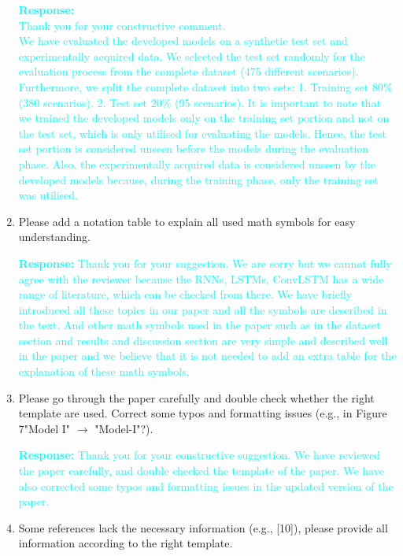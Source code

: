 \documentclass[11pt,a2paper]{report}
\begin{document}
\begin{enumerate}
		\textcolor{Cyan}{
			\textbf{Response:\\}
			Thank you for your constructive comment. \\
			We have evaluated the developed models on a synthetic test set and experimentally acquired data.
			We selected the test set randomly for the evaluation process from the complete dataset (475 different scenarios).
			Furthermore, we split the complete dataset into two sets: 
			1. Training set $80\%$ (380 scenarios). 
			2. Test set $20\%$ (95 scenarios).
			It is important to note that we trained the developed models only on the training set portion and not on the test set, which is only utilised for evaluating the models.
			Hence, the test set portion is considered unseen before the models during the evaluation phase.
			Also, the experimentally acquired data is considered unseen by the developed models because, during the training phase, only the training set was utilised.
		}
	
			\item Please add a notation table to explain all used math symbols 
			for easy understanding.
	
	\textcolor{Cyan}{
		\textbf{Response:}
	Thank you for your suggestion.
	We are sorry but we cannot fully agree with the reviewer because the RNNs, 
	LSTMs, ConvLSTM has a wide range of literature, which can be checked from 
	there. 
	We have briefly introduced all these topics in our paper and all 
	the symbols are described in the text.
    And other math symbols used in the paper such as in the dataset section and 
    results and discussion section are very simple and described well in the 
    paper and we believe that it is not needed to add an extra table for the 
    explanation of these math symbols.}	

			\item Please go through the paper carefully and double check 
			whether the right template are used. Correct some typos and 
			formatting issues (e.g., in Figure 7"Model I" $\to$ "Model-I"?).

    \textcolor{Cyan}{
	\textbf{Response:}
	Thank you for your constructive suggestion.
	We have reviewed the paper carefully, and double checked the template of 
	the paper.
	We have also corrected some typos and formatting issues in the updated 
	version of the paper.
}

			\item Some references lack the necessary information (e.g., [10]), 
			please provide all information according to the right template.


\end{enumerate}
\end{document}
